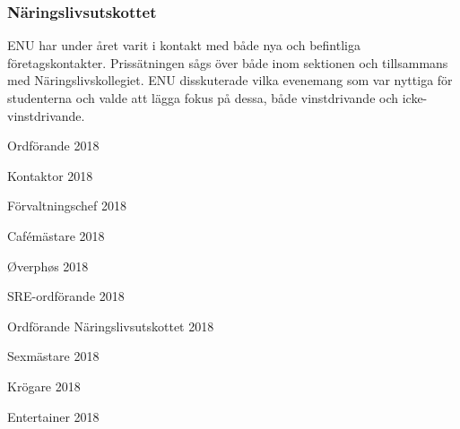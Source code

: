 \documentclass[../_main/handlingar.tex]{subfiles}
\begin{document}
\subsubsection*{Näringslivsutskottet}

ENU har under året varit i kontakt med både nya och befintliga företagskontakter. Prissätningen sågs
över både inom sektionen och tillsammans med Näringslivskollegiet. ENU disskuterade vilka
evenemang som var nyttiga för studenterna och valde att lägga fokus på dessa, både vinstdrivande och
icke-vinstdrivande.

\newpage
\begin{signatures}{10}
    \mvh
    \signature{Daniel Bakic}{Ordförande 2018}
    \signature{Axel Voss}{Kontaktor 2018}
    \signature{Magnus Lundh}{Förvaltningschef 2018}
    \signature{Elin Johansson}{Cafémästare 2018}
    \signature{Andreas Bennström}{Øverphøs 2018}
    \signature{Fanny Månefjord}{SRE-ordförande 2018}
    \signature{Isabella Hansen}{Ordförande Näringslivsutskottet 2018}
    \signature{Alexander Wik}{Sexmästare 2018}
    \signature{Malin Heyden}{Krögare 2018}
    \signature{Adam Belfrage}{Entertainer 2018}
\end{signatures}
\end{document}
